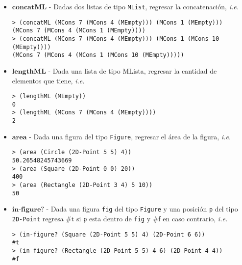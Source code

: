 \documentclass{article}
\begin{document}
\begin{itemize}
\item $\textbf{concatML}$ - Dadas dos listas de tipo \texttt{MList},
  regresar la concatenación, \textit{i.e.}
\begin{verbatim}
> (concatML (MCons 7 (MCons 4 (MEmpty))) (MCons 1 (MEmpty)))
(MCons 7 (MCons 4 (MCons 1 (MEmpty))))
> (concatML (MCons 7 (MCons 4 (MEmpty))) (MCons 1 (MCons 10 (MEmpty))))
(MCons 7 (MCons 4 (MCons 1 (MCons 10 (MEmpty)))))
\end{verbatim}

\item $\textbf{lengthML}$ - Dada una lista de tipo MLista, regresar la
  cantidad de elementos que tiene, \textit{i.e.}
\begin{verbatim}
> (lengthML (MEmpty))
0
> (lengthML (MCons 7 (MCons 4 (MEmpty))))
2
\end{verbatim}

\item $\textbf{area}$ - Dada una figura del tipo \texttt{Figure},
  regresar el área de la figura, \textit{i.e.}
\begin{verbatim}
> (area (Circle (2D-Point 5 5) 4))
50.26548245743669
> (area (Square (2D-Point 0 0) 20))
400
> (area (Rectangle (2D-Point 3 4) 5 10))
50
\end{verbatim}

\item $\textbf{in-figure?}$ - Dada una figura \texttt{fig} del tipo \texttt{Figure}
  y una posición \texttt{p} del tipo \texttt{2D-Point} regresa \#t si \texttt{p} esta
  dentro de \texttt{fig} y \#f en caso contrario, \textit{i.e.}
\begin{verbatim}
> (in-figure? (Square (2D-Point 5 5) 4) (2D-Point 6 6))
#t
> (in-figure? (Rectangle (2D-Point 5 5) 4 6) (2D-Point 4 4))
#f
\end{verbatim}

\end{itemize}
\end{document}
